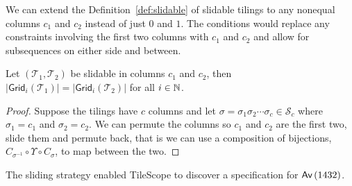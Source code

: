We can extend the Definition~\ref{def:slidable} of slidable tilings to any nonequal columns $c_1$ and $c_2$ instead of just $0$ and $1$. The conditions would replace any constraints involving the first two columns with $c_1$ and $c_2$ and allow for subsequences on either side and between.

\begin{proposition}
Let $(\mathcal{T}_1,\mathcal{T}_2)$ be slidable in columns $c_1$ and $c_2$, then $|\textsf{Grid}_i(\mathcal{T}_1)| = |\textsf{Grid}_i(\mathcal{T}_2)|$ for all $i\in\mathbb{N}$.
\end{proposition}
\begin{proof}
Suppose the tilings have $c$ columns and let $\sigma = \sigma_1\sigma_2 \cdots \sigma_c \in \mathcal{S}_c$ where $\sigma_1 = c_1$ and $\sigma_2 = c_2$. We can permute the columns so $c_1$ and $c_2$ are the first two, slide them and permute back, that is we can use a composition of bijections, $C_{\sigma^{-1}} \circ \Upsilon \circ C_\sigma$, to map between the two.
\end{proof}

The sliding strategy enabled TileScope to discover a specification for $\textsf{Av}\left(1432\right)$.